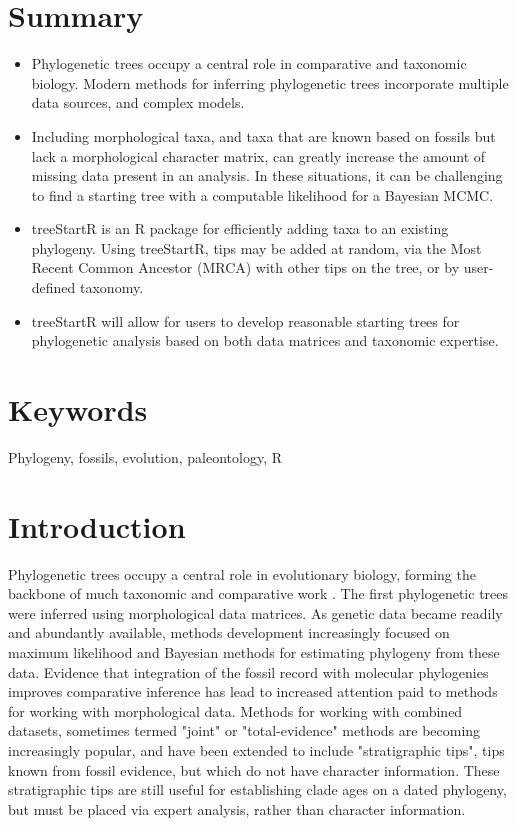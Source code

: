 \section{Summary}
\begin{itemize}
\item Phylogenetic trees occupy a central role in comparative and taxonomic biology. Modern methods for inferring phylogenetic trees incorporate multiple data sources, and complex models.
\item Including morphological taxa, and taxa that are known based on fossils but lack a morphological character matrix, can greatly increase the amount of missing data present in an analysis. In these situations, it can be challenging to find a starting tree with a computable likelihood for a Bayesian MCMC.
\item treeStartR is an R package for efficiently adding taxa to an existing phylogeny. 
Using treeStartR, tips may be added at random, via the Most Recent Common Ancestor (MRCA) with other tips on the tree, or by user-defined taxonomy.
\item treeStartR will allow for users to develop reasonable starting trees for phylogenetic analysis based on both data matrices and taxonomic expertise.
\end{itemize}

\section{Keywords}
Phylogeny, fossils, evolution, paleontology, R

\section{Introduction}

Phylogenetic trees occupy a central role in evolutionary biology, forming the backbone of much taxonomic \citep{Sneath1973} and comparative work \citep{felsenstein1985a}. 
The first phylogenetic trees were inferred using morphological data matrices.
As genetic data became readily and abundantly available, methods development increasingly focused on maximum likelihood and Bayesian methods for estimating phylogeny from these data.
Evidence that integration of the fossil record with molecular phylogenies improves comparative inference has lead to increased attention paid to methods for working with morphological data.
Methods for working with combined datasets, sometimes termed "joint" or "total-evidence" methods are becoming increasingly popular, and have been extended to include "stratigraphic tips", tips known from fossil evidence, but which do not have character information.
These stratigraphic tips are still useful for establishing clade ages on a dated phylogeny, but must be placed via expert analysis, rather than character information.


